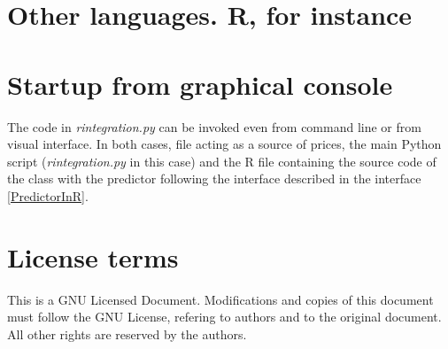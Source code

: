 \documentclass[11pt,a4paper]{article}
\begin{document}
\section{Other languages. R, for instance}


\section{Startup from graphical console}

The code in \emph{rintegration.py} can be invoked even from command line or
from visual interface. In both cases, file acting as a source of prices,
the main Python script (\emph{rintegration.py} in this case) and the R file
containing the source code of the class with the predictor following the 
interface described in the interface \ref{PredictorInR}.


\section{License terms}

This is a GNU Licensed Document. Modifications and copies of this document
must follow the GNU License, refering to authors and to the original document.
All other rights are reserved by the authors.
\end{document}
